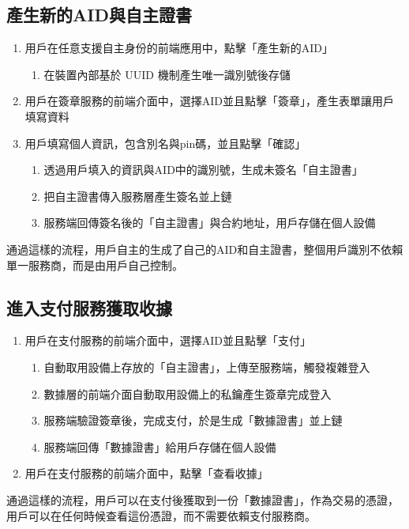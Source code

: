 \subsection{產生新的AID與自主證書}
\begin{enumerate}
  \item 用戶在任意支援自主身份的前端應用中，點擊「產生新的AID」
        \begin{enumerate}
          \item 在裝置內部基於 UUID 機制產生唯一識別號後存儲
        \end{enumerate}
  \item 用戶在簽章服務的前端介面中，選擇AID並且點擊「簽章」，產生表單讓用戶填寫資料
  \item 用戶填寫個人資訊，包含別名與pin碼，並且點擊「確認」
        \begin{enumerate}
          \item 透過用戶填入的資訊與AID中的識別號，生成未簽名「自主證書」
          \item 把自主證書傳入服務層產生簽名並上鏈
          \item 服務端回傳簽名後的「自主證書」與合約地址，用戶存儲在個人設備
        \end{enumerate}
\end{enumerate}
通過這樣的流程，用戶自主的生成了自己的AID和自主證書，整個用戶識別不依賴單一服務商，而是由用戶自己控制。
\subsection{進入支付服務獲取收據}
\begin{enumerate}
  \item 用戶在支付服務的前端介面中，選擇AID並且點擊「支付」
        \begin{enumerate}
          \item 自動取用設備上存放的「自主證書」，上傳至服務端，觸發複雜登入
          \item 數據層的前端介面自動取用設備上的私鑰產生簽章完成登入
          \item 服務端驗證簽章後，完成支付，於是生成「數據證書」並上鏈
          \item 服務端回傳「數據證書」給用戶存儲在個人設備
        \end{enumerate}
  \item 用戶在支付服務的前端介面中，點擊「查看收據」
\end{enumerate}
通過這樣的流程，用戶可以在支付後獲取到一份「數據證書」，作為交易的憑證，用戶可以在任何時候查看這份憑證，而不需要依賴支付服務商。
